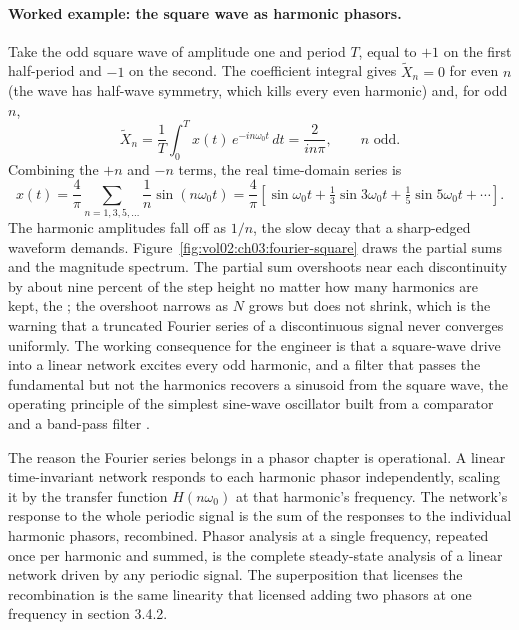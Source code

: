 \paragraph{Worked example: the square wave as harmonic phasors.}
Take the odd square wave of amplitude one and period $T$, equal to
$+1$ on the first half-period and $-1$ on the second. The coefficient
integral gives $\tilde X_{n} = 0$ for even $n$ (the wave has half-wave
symmetry, which kills every even harmonic) and, for odd $n$,
\[
\tilde X_{n} = \frac{1}{T} \int_{0}^{T} x(t)\, e^{-i n \omega_{0} t}\, dt
= \frac{2}{i n \pi}, \qquad n \text{ odd}.
\]
Combining the $+n$ and $-n$ terms, the real time-domain series is
\[
x(t) = \frac{4}{\pi} \sum_{n = 1, 3, 5, \dots} \frac{1}{n}\sin(n\omega_{0} t)
= \frac{4}{\pi}\left[\sin\omega_{0} t + \tfrac{1}{3}\sin 3\omega_{0} t
+ \tfrac{1}{5}\sin 5\omega_{0} t + \cdots\right].
\]
The harmonic amplitudes fall off as $1/n$, the slow decay that a
sharp-edged waveform demands. Figure~\ref{fig:vol02:ch03:fourier-square}
draws the partial sums and the magnitude spectrum. The partial sum
overshoots near each discontinuity by about nine percent of the step
height no matter how many harmonics are kept, the ; the overshoot narrows as $N$ grows but does not shrink,
which is the warning that a truncated Fourier series of a discontinuous
signal never converges uniformly. The working consequence for the
engineer is that a square-wave drive into a linear network excites
every odd harmonic, and a filter that passes the fundamental but not
the harmonics recovers a sinusoid from the square wave, the operating
principle of the simplest sine-wave oscillator built from a comparator
and a band-pass filter \cite[chapter 4]{hist:fourier1822}.



The reason the Fourier series belongs in a phasor chapter is
operational. A linear time-invariant network responds to each
harmonic phasor independently, scaling it by the transfer function
$H(n\omega_{0})$ at that harmonic's frequency. The network's response
to the whole periodic signal is the sum of the responses to the
individual harmonic phasors, recombined. Phasor analysis at a single
frequency, repeated once per harmonic and summed, is the complete
steady-state analysis of a linear network driven by any periodic
signal. The superposition that licenses the recombination is the same
linearity that licensed adding two phasors at one frequency in
section 3.4.2.


